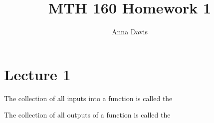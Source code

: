 \documentclass{ximera}
\author{Anna Davis} \title{MTH 160 Homework 1}
\begin{document}
\begin{abstract}

\end{abstract}
\maketitle
 
 \section{Lecture 1}
\begin{problem}\label{prob:160hom1prob1}
The collection of all inputs into a function is called the
\begin{multipleChoice}  
\end{multipleChoice}  
\end{problem}

\begin{problem}\label{prob:160hom1prob2}
The collection of all outputs of a function is called the
\begin{multipleChoice}  
\end{multipleChoice}  
\end{problem}
\end{document}
